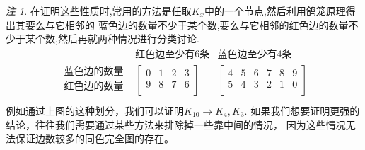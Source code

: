 \documentclass[a4paper,11pt]{article}%
\theoremstyle{remark}
\newtheorem*{remark}{注}
\theoremstyle{remark}
\theoremstyle{definition}
\theoremstyle{definition}
\theoremstyle{definition}
\begin{document}
\begin{remark}
    在证明这些性质时,常用的方法是任取$K_x$中的一个节点,然后利用鸽笼原理得出其要么与它相邻的
    蓝色边的数量不少于某个数,要么与它相邻的红色边的数量不少于某个数,然后再就两种情况进行分类讨论.
    \[\begin{matrix}
            &\text{红色边至少有6条}&\text{蓝色边至少有4条}\\
        \begin{matrix}
            \text{蓝色边的数量}\\
            \text{红色边的数量}\\
        \end{matrix}
            &
        \begin{bmatrix}
            0 & 1 & 2 & 3 \\
            9 & 8 & 7 & 6 \\
        \end{bmatrix} 
            &
        \begin{bmatrix}
            4 & 5 & 6 & 7 & 8 & 9\\
            5 & 4 & 3 & 2 & 1 & 0\\
        \end{bmatrix}
            \\
    \end{matrix}\]
    例如通过上图的这种划分，我们可以证明$K_{10}\rightarrow K_4,K_3$.
    如果我们想要证明更强的结论，往往我们需要通过某些方法来排除掉一些靠中间的情况，
    因为这些情况无法保证边数较多的同色完全图的存在。


\end{remark}
\end{document}
